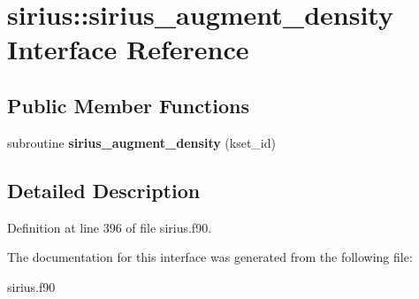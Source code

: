 \hypertarget{interfacesirius_1_1sirius__augment__density}{}\section{sirius\+:\+:sirius\+\_\+augment\+\_\+density Interface Reference}
\label{interfacesirius_1_1sirius__augment__density}
\subsection*{Public Member Functions}
\begin{DoxyCompactItemize}
\item 
\hypertarget{interfacesirius_1_1sirius__augment__density_abec6a874bbaad337a497f225bbd84d52}{}subroutine {\bfseries sirius\+\_\+augment\+\_\+density} (kset\+\_\+id)\label{interfacesirius_1_1sirius__augment__density_abec6a874bbaad337a497f225bbd84d52}

\end{DoxyCompactItemize}


\subsection{Detailed Description}


Definition at line 396 of file sirius.\+f90.



The documentation for this interface was generated from the following file\+:\begin{DoxyCompactItemize}
\item 
sirius.\+f90\end{DoxyCompactItemize}
